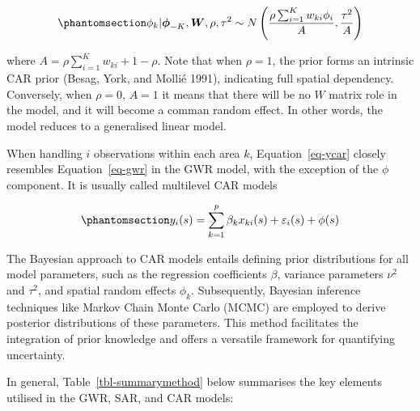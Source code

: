 \documentclass[
  default,
]{sn-jnl}
\begin{document}
\begin{equation}\phantomsection\label{eq-phicar}{
\phi_k|\boldsymbol\phi_{-K}, \boldsymbol{W},\rho, \tau^2  \sim  N\left(\frac{\rho\sum_{i=1}^Kw_{ki}\phi_i}{A},\frac{\tau^2}{A}\right)
}\end{equation}

where \(A = \rho\sum_{i=1}^Kw_{ki}+1-\rho\). Note that when
\(\rho = 1\), the prior forms an intrinsic CAR prior (Besag, York, and
Mollié 1991), indicating full spatial dependency. Conversely, when
\(\rho = 0\), \(A = 1\) it means that there will be no \(W\) matrix role
in the model, and it will become a comman random effect. In other words,
the model reduces to a generalised linear model.

When handling \(i\) observations within each area \(k\),
Equation~\ref{eq-ycar} closely resembles Equation~\ref{eq-gwr} in the
GWR model, with the exception of the \(\phi\) component. It is usually
called multilevel CAR models

\begin{equation}\phantomsection\label{eq-ycar}{
y_i(s) = \sum_{k=1}^p \beta_k x_{ki}(s) + \varepsilon_i(s) + \phi(s)
}\end{equation}

The Bayesian approach to CAR models entails defining prior distributions
for all model parameters, such as the regression coefficients \(\beta\),
variance parameters \(\nu^2\) and \(\tau^2\), and spatial random effects
\(\phi_k\). Subsequently, Bayesian inference techniques like Markov
Chain Monte Carlo (MCMC) are employed to derive posterior distributions
of these parameters. This method facilitates the integration of prior
knowledge and offers a versatile framework for quantifying uncertainty.

In general, Table~\ref{tbl-summarymethod} below summarises the key
elements utilised in the GWR, SAR, and CAR models:

\begingroup\fontsize{9}{11}\selectfont
\end{document}
